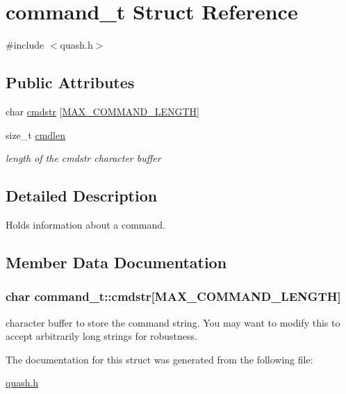 \hypertarget{structcommand__t}{}\section{command\+\_\+t Struct Reference}
\label{structcommand__t}


{\ttfamily \#include $<$quash.\+h$>$}

\subsection*{Public Attributes}
\begin{DoxyCompactItemize}
\item 
char \hyperlink{structcommand__t_a3b77457907f6e606ffafb2f1c2dbfa49}{cmdstr} \mbox{[}\hyperlink{quash_8h_af1abcb51a4aa27a5a5a7958c03448134}{M\+A\+X\+\_\+\+C\+O\+M\+M\+A\+N\+D\+\_\+\+L\+E\+N\+G\+T\+H}\mbox{]}
\item 
\hypertarget{structcommand__t_a6728ce7c3f0c69523ac3d4c74477f8d2}{}size\+\_\+t \hyperlink{structcommand__t_a6728ce7c3f0c69523ac3d4c74477f8d2}{cmdlen}\label{structcommand__t_a6728ce7c3f0c69523ac3d4c74477f8d2}

\begin{DoxyCompactList}\small\item\em length of the cmdstr character buffer \end{DoxyCompactList}\end{DoxyCompactItemize}


\subsection{Detailed Description}
Holds information about a command. 

\subsection{Member Data Documentation}
\hypertarget{structcommand__t_a3b77457907f6e606ffafb2f1c2dbfa49}{}
\subsubsection[{cmdstr}]{\setlength{\rightskip}{0pt plus 5cm}char command\+\_\+t\+::cmdstr\mbox{[}{\bf M\+A\+X\+\_\+\+C\+O\+M\+M\+A\+N\+D\+\_\+\+L\+E\+N\+G\+T\+H}\mbox{]}}\label{structcommand__t_a3b77457907f6e606ffafb2f1c2dbfa49}
character buffer to store the command string. You may want to modify this to accept arbitrarily long strings for robustness. 

The documentation for this struct was generated from the following file\+:\begin{DoxyCompactItemize}
\item 
\hyperlink{quash_8h}{quash.\+h}\end{DoxyCompactItemize}
